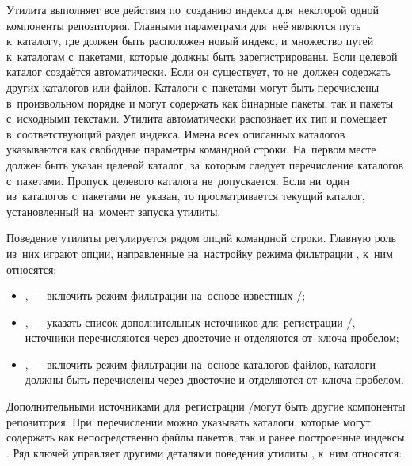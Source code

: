 Утилита  выполняет все действия по~созданию индекса для~некоторой одной компоненты репозитория.
Главными параметрами для~неё являются путь к~каталогу, где должен быть расположен новый индекс,
и множество путей к~каталогам с~пакетами, которые должны быть зарегистрированы.
Если целевой каталог создаётся автоматически.
Если он существует, то не~должен содержать других каталогов или файлов.
Каталоги с~пакетами могут быть перечислены в~произвольном порядке и могут содержать как бинарные пакеты, так и пакеты  с~исходными текстами.
Утилита  автоматически распознает их тип и помещает в~соответствующий раздел индекса.
Имена всех описанных каталогов указываются как свободные параметры командной строки.
На~первом месте должен быть указан целевой каталог, за~которым следует перечисление каталогов с~пакетами.
Пропуск целевого каталога не~допускается. 
Если ни~один из~каталогов с~пакетами не~указан, то просматривается текущий каталог, установленный на~момент запуска утилиты.

Поведение утилиты регулируется рядом опций командной строки.
Главную роль из~них играют опции, направленные на~настройку режима фильтрации \provides, к~ним относятся:

\begin{itemize}

\item{
,  --- включить режим фильтрации \provides на~основе известных \requires/\conflicts; %
}

\item {
,  --- указать список дополнительных источников для~регистрации \requires/\conflicts, 
источники перечисляются через двоеточие и отделяются от~ключа пробелом;
}

\item {
,  --- включить режим фильтрации \provides на~основе каталогов файлов,
каталоги должны быть перечислены через двоеточие и отделяются от~ключа пробелом.
}

\end{itemize}

Дополнительными источниками  для~регистрации \requires/\conflicts могут быть другие компоненты репозитория.
При~перечислении можно указывать каталоги, которые могут содержать как непосредственно файлы пакетов, так и ранее построенные индексы \ds.
Ряд ключей управляет другими деталями поведения утилиты , к~ним относятся:

